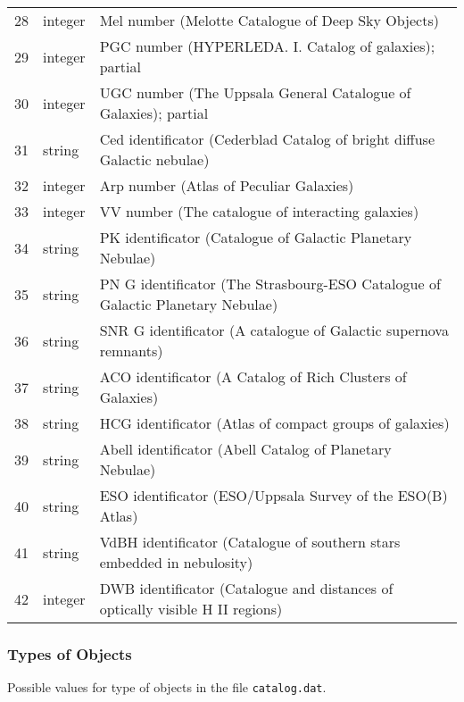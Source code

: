 \begin{longtable}{r|l|p{110mm}}
28 & integer & Mel number (Melotte Catalogue of Deep Sky Objects)\\
29 & integer & PGC number (HYPERLEDA. I. Catalog of galaxies); partial\\
30 & integer & UGC number (The Uppsala General Catalogue of Galaxies); partial\\
31 & string  & Ced identificator (Cederblad Catalog of bright diffuse Galactic nebulae)\\
32 & integer & Arp number (Atlas of Peculiar Galaxies)\\
33 & integer & VV number (The catalogue of interacting galaxies)\\
34 & string  & PK identificator (Catalogue of Galactic Planetary Nebulae)\\
35 & string  & PN G identificator (The Strasbourg-ESO Catalogue of Galactic Planetary Nebulae)\\
36 & string  & SNR G identificator (A catalogue of Galactic supernova remnants)\\
37 & string  & ACO identificator (A Catalog of Rich Clusters of Galaxies)\\
38 & string  & HCG identificator (Atlas of compact groups of galaxies)\\
39 & string  & Abell identificator (Abell Catalog of Planetary Nebulae)\\
40 & string  & ESO identificator (ESO/Uppsala Survey of the ESO(B) Atlas)\\
41 & string  & VdBH identificator (Catalogue of southern stars embedded in nebulosity)\\
42 & integer & DWB identificator (Catalogue and distances of optically visible H II regions)\\
\bottomrule
\end{longtable}

\subsubsection{Types of Objects}
\label{sec:dso:types}

Possible values for type of objects in the file \texttt{catalog.dat}.

